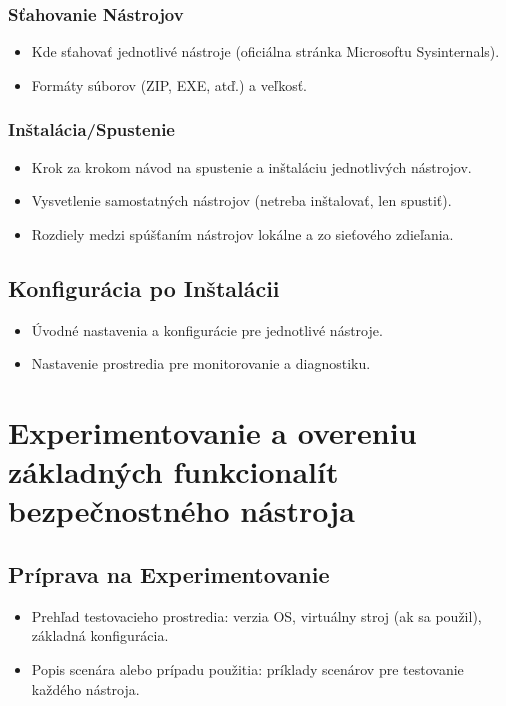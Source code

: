 \documentclass[conference]{IEEEtran}
\begin{document}
\subsubsection{Sťahovanie Nástrojov}
\begin{itemize}
    \item Kde sťahovať jednotlivé nástroje (oficiálna stránka Microsoftu Sysinternals).
    \item Formáty súborov (ZIP, EXE, atď.) a veľkosť.
\end{itemize}

\subsubsection{Inštalácia/Spustenie}
\begin{itemize}
    \item Krok za krokom návod na spustenie a inštaláciu jednotlivých nástrojov.
    \item Vysvetlenie samostatných nástrojov (netreba inštalovať, len spustiť).
    \item Rozdiely medzi spúšťaním nástrojov lokálne a zo sieťového zdieľania.
\end{itemize}

\subsection{Konfigurácia po Inštalácii}
\begin{itemize}
    \item Úvodné nastavenia a konfigurácie pre jednotlivé nástroje.
    \item Nastavenie prostredia pre monitorovanie a diagnostiku.
\end{itemize}

\section{Experimentovanie a overeniu základných funkcionalít bezpečnostného nástroja}
\subsection{Príprava na Experimentovanie}
\begin{itemize}
    \item Prehľad testovacieho prostredia: verzia OS, virtuálny stroj (ak sa použil), základná konfigurácia.
    \item Popis scenára alebo prípadu použitia: príklady scenárov pre testovanie každého nástroja.
\end{itemize}
\end{document}
